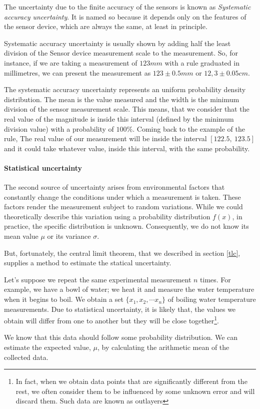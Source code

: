 \begin{paracol}{2}
The uncertainty due to the finite accuracy of the sensors is known as \emph{Systematic accuracy uncertainty}. It is named so because it depends only on the features of the sensor device, which are always the same, at least in principle. 

Systematic accuracy uncertainty is usually shown by adding half the least division of the Sensor device measurement scale to the measurement. So, for instance, if we are taking a measurement of $123 mm$ with a rule graduated in millimetres, we can present the measurement as  $123 \pm 0.5 mm$ or $12,3\pm0.05cm$.

The systematic accuracy uncertainty represents an uniform probability density distribution. The mean is the value measured and the width is the minimum division of the sensor measurement scale. This means, that we consider that the real value of the magnitude is inside this interval (defined by the minimum division value) with a probability of $100\%$. Coming back to the example of the rule, The real value of our measurement will be inside the interval $[122.5,\ 123.5 ]$ and it could take whatever value, inside this interval, with the same probability. 

\paragraph{Statistical uncertainty}
The second source of uncertainty arises from environmental factors that constantly change the conditions under which a measurement is taken. These factors render the measurement subject to random variations. While we could theoretically describe this variation using a probability distribution $f(x)$, in practice, the specific distribution is unknown. Consequently, we do not know its mean value $\mu$ or its variance $\sigma$.

But, fortunately, the central limit theorem, that we described in section \ref{tlc}, supplies a method to estimate the statical uncertainty.

Let's suppose we repeat the same experimental measurement $n$ times. For example, we have a bowl of water; we heat it and measure the water temperature when it begins to boil. We obtain a set $\{x_1,x_2,\cdots x_n\}$ of boiling water temperature measurements. Due to statistical uncertainty, it is likely that,  the values we obtain will differ from one to another but they will be close together\footnote{In fact, when we obtain data points that are significantly different from the rest, we often consider them to be influenced by some unknown error and will discard them. Such data are known as outlayers}.

We know that this data should follow some probability distribution. We can estimate the expected value, $\mu$, by calculating the arithmetic mean of the collected data.
\end{paracol}

